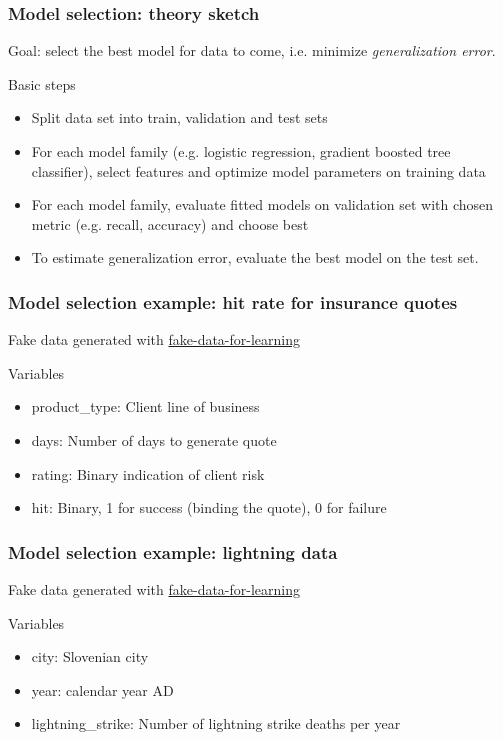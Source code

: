 \begin{frame}
  \frametitle{Model selection: theory sketch}
  Goal: select the best model for data to come, i.e. minimize \emph{generalization error}.\newline

  Basic steps
  \begin{itemize}
    \item {\color{blue}Split data} set into train, validation and test sets
    \item For each model family (e.g. logistic regression, gradient boosted tree classifier), {\color{blue}select features} and {\color{blue}optimize model parameters} on training data
    \item For each model family, {\color{blue}evaluate fitted models} on validation set with chosen metric (e.g. recall, accuracy) and choose best
    \item To {\color{blue}estimate generalization error}, evaluate the best model on the test set.
  \end{itemize}
\end{frame}

\begin{frame}
\frametitle{Model selection example: hit rate for insurance quotes}
Fake data generated with \href{https://github.com/munichpavel/fake-data-for-learning}{fake-data-for-learning}\newline

 \newline

 Variables
\begin{itemize}
\item product\_type: Client line of business
\item days: Number of days to generate quote
\item rating: Binary indication of client risk
\item hit: Binary, 1 for success (binding the quote), 0 for failure
\end{itemize}
\end{frame}


\begin{frame}
\frametitle{Model selection example: lightning data}
Fake data generated with \href{https://github.com/munichpavel/fake-data-for-learning}{fake-data-for-learning}\newline

 \newline

 Variables
\begin{itemize}
\item city: Slovenian city
\item year: calendar year AD
\item lightning\_strike: Number of lightning strike deaths per year
\end{itemize}
\end{frame}

